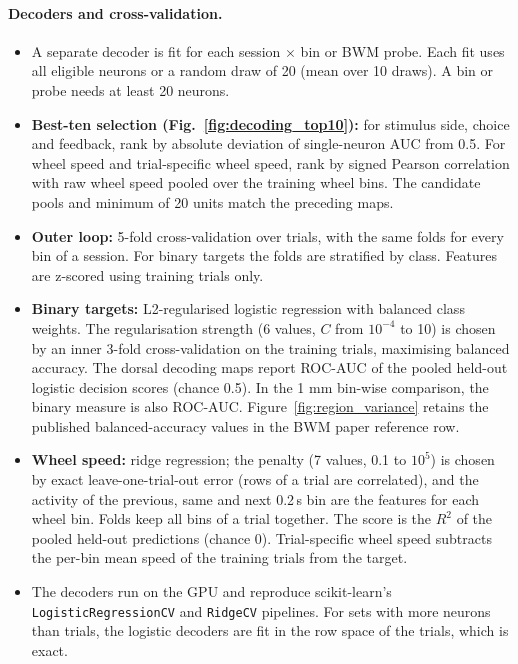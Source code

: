 \documentclass[10pt]{article}
\newcommand{\figref}[1]{Fig.~\ref{fig:#1}}
\begin{document}
\paragraph{Decoders and cross-validation.}
\begin{itemize}
  \item A separate decoder is fit for each session $\times$ bin or BWM probe. Each fit uses all eligible neurons or a random draw of 20 (mean over 10 draws). A bin or probe needs at least 20 neurons.
  \item \textbf{Best-ten selection (\figref{decoding_top10}):} for stimulus side, choice and feedback, rank by absolute deviation of single-neuron AUC from 0.5. For wheel speed and trial-specific wheel speed, rank by signed Pearson correlation with raw wheel speed pooled over the training wheel bins. The candidate pools and minimum of 20 units match the preceding maps.
  \item \textbf{Outer loop:} 5-fold cross-validation over trials, with the same folds for every bin of a session. For binary targets the folds are stratified by class. Features are z-scored using training trials only.
  \item \textbf{Binary targets:} L2-regularised logistic regression with balanced class weights. The regularisation strength (6 values, $C$ from $10^{-4}$ to 10) is chosen by an inner 3-fold cross-validation on the training trials, maximising balanced accuracy. The dorsal decoding maps report ROC-AUC of the pooled held-out logistic decision scores (chance 0.5). In the 1 mm bin-wise comparison, the binary measure is also ROC-AUC. Figure~\ref{fig:region_variance} retains the published balanced-accuracy values in the BWM paper reference row.
  \item \textbf{Wheel speed:} ridge regression; the penalty (7 values, 0.1 to $10^5$) is chosen by exact leave-one-trial-out error (rows of a trial are correlated), and the activity of the previous, same and next 0.2\,s bin are the features for each wheel bin. Folds keep all bins of a trial together. The score is the $R^2$ of the pooled held-out predictions (chance 0). Trial-specific wheel speed subtracts the per-bin mean speed of the training trials from the target.
  \item The decoders run on the GPU and reproduce scikit-learn's \texttt{LogisticRegressionCV} and \texttt{RidgeCV} pipelines. For sets with more neurons than trials, the logistic decoders are fit in the row space of the trials, which is exact.
\end{itemize}
\end{document}
